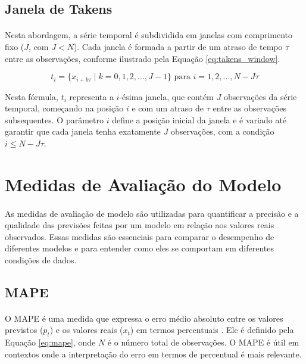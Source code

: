\subsection{Janela de Takens}
\paragraph{} Nesta abordagem, a série temporal é subdividida em janelas com comprimento fixo (\(J\), com \(J < N\)). Cada janela é formada a partir de um atraso de tempo \(\tau\) entre as observações, conforme ilustrado pela Equação \ref{eq:takens_window}.

\begin{equation}
	t_i = \{x_{i + k\tau} \mid k = 0, 1, 2, \ldots, J - 1\} \text{ para } i = 1, 2, \ldots, N - J\tau
	\label{eq:takens_window}
\end{equation}

Nesta fórmula, \(t_i\) representa a \(i\)-ésima janela, que contém \(J\) observações da série temporal, começando na posição \(i\) e com um atraso de \(\tau\) entre as observações subsequentes. O parâmetro \(i\) define a posição inicial da janela e é variado até garantir que cada janela tenha exatamente \(J\) observações, com a condição \(i \leq N - J\tau\).


\section{Medidas de Avaliação do Modelo}
\paragraph{} As medidas de avaliação de modelo são utilizadas para quantificar a precisão e a qualidade das previsões feitas por um modelo em relação aos valores reais observados. Essas medidas são essenciais para comparar o desempenho de diferentes modelos e para entender como eles se comportam em diferentes condições de dados.

\subsection{\acf{MAPE}}
\paragraph{} O \ac{MAPE} é uma medida que expressa o erro médio absoluto entre os valores previstos (\(p_t\)) e os valores reais (\(x_t\)) em termos percentuais \cite{oracle_mape}. Ele é definido pela Equação \ref{eq:mape}, onde \(N\) é o número total de observações. O \ac{MAPE} é útil em contextos onde a interpretação do erro em termos de percentual é mais relevante.

